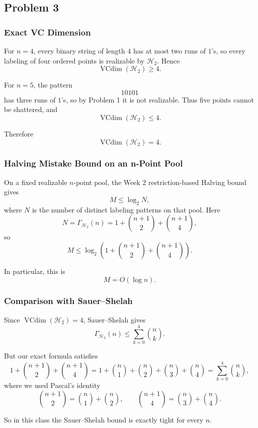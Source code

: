 \documentclass{article}
\begin{document}
\subsection{Problem 3}

\subsubsection{Exact VC Dimension}

For $n=4$, every binary string of length $4$ has at most two runs of $1$'s, so every labeling of four ordered points is realizable by $\mathcal{H}_2$. Hence
$$
\operatorname{VCdim}(\mathcal{H}_2) \ge 4.
$$

For $n=5$, the pattern
$$
10101
$$
has three runs of $1$'s, so by Problem 1 it is not realizable. Thus five points cannot be shattered, and
$$
\operatorname{VCdim}(\mathcal{H}_2) \le 4.
$$

Therefore
$$
\operatorname{VCdim}(\mathcal{H}_2) = 4.
$$

\subsubsection{Halving Mistake Bound on an n-Point Pool}

On a fixed realizable $n$-point pool, the Week 2 restriction-based Halving bound gives
$$
M \le \log_2 N,
$$
where $N$ is the number of distinct labeling patterns on that pool. Here
$$
N = \Gamma_{\mathcal{H}_2}(n)
=
1 + \binom{n+1}{2} + \binom{n+1}{4},
$$
so
$$
M
\le
\log_2\!\left(1 + \binom{n+1}{2} + \binom{n+1}{4}\right).
$$

In particular, this is
$$
M = O(\log n).
$$

\subsubsection{Comparison with Sauer--Shelah}

Since $\operatorname{VCdim}(\mathcal{H}_2) = 4$, Sauer--Shelah gives
$$
\Gamma_{\mathcal{H}_2}(n)
\le
\sum_{k=0}^4 \binom{n}{k}.
$$

But our exact formula satisfies
$$
1 + \binom{n+1}{2} + \binom{n+1}{4}
=
1 + \binom{n}{1} + \binom{n}{2} + \binom{n}{3} + \binom{n}{4}
=
\sum_{k=0}^4 \binom{n}{k},
$$
where we used Pascal's identity
$$
\binom{n+1}{2} = \binom{n}{1} + \binom{n}{2},
\qquad
\binom{n+1}{4} = \binom{n}{3} + \binom{n}{4}.
$$

So in this class the Sauer--Shelah bound is exactly tight for every $n$.
\end{document}
